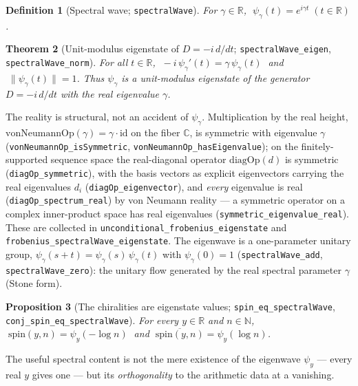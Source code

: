 \documentclass[11pt]{article}
\newtheorem{definition}{Definition}[section]
\newtheorem{theorem}[definition]{Theorem}
\newtheorem{proposition}[definition]{Proposition}
\newcommand{\C}{\mathbb{C}}
\newcommand{\R}{\mathbb{R}}
\newcommand{\N}{\mathbb{N}}
\newcommand{\conj}[1]{\overline{#1}}
\newcommand{\code}[1]{\texttt{#1}}
\begin{document}
\begin{definition}[Spectral wave; \code{spectralWave}]\label{def:wave}
For $\gamma\in\R$, $\;\psi_\gamma(t)=e^{i\gamma t}\;(t\in\R)$.
\end{definition}

\begin{theorem}[Unit-modulus eigenstate of $D=-i\,d/dt$; \code{spectralWave\_eigen}, \code{spectralWave\_norm}]\label{thm:wave}
For all $t\in\R$, $\;-i\,\psi_\gamma'(t)=\gamma\,\psi_\gamma(t)\;$ and $\;\|\psi_\gamma(t)\|=1$. Thus
$\psi_\gamma$ is a unit-modulus eigenstate of the generator $D=-i\,d/dt$ with the real eigenvalue
$\gamma$.
\end{theorem}

The reality is structural, not an accident of $\psi_\gamma$. Multiplication by the real height,
$\mathrm{vonNeumannOp}(\gamma)=\gamma\cdot\mathrm{id}$ on the fiber $\C$, is symmetric with
eigenvalue $\gamma$ (\code{vonNeumannOp\_isSymmetric}, \code{vonNeumannOp\_hasEigenvalue}); on the
finitely-supported sequence space the real-diagonal operator $\mathrm{diagOp}(d)$ is symmetric
(\code{diagOp\_symmetric}), with the basis vectors as explicit eigenvectors carrying the real
eigenvalues $d_i$ (\code{diagOp\_eigenvector}), and \emph{every} eigenvalue is real
(\code{diagOp\_spectrum\_real}) by von Neumann reality --- a symmetric operator on a complex
inner-product space has real eigenvalues (\code{symmetric\_eigenvalue\_real}). These are collected in
\code{unconditional\_frobenius\_eigenstate} and \code{frobenius\_spectralWave\_eigenstate}. The
eigenwave is a one-parameter unitary group, $\psi_\gamma(s+t)=\psi_\gamma(s)\,\psi_\gamma(t)$ with
$\psi_\gamma(0)=1$ (\code{spectralWave\_add}, \code{spectralWave\_zero}): the unitary flow generated by
the real spectral parameter $\gamma$ (Stone form).

\begin{proposition}[The chiralities are eigenstate values; \code{spin\_eq\_spectralWave}, \code{conj\_spin\_eq\_spectralWave}]\label{prop:chiral}
For every $y\in\R$ and $n\in\N$, $\;\mathrm{spin}(y,n)=\psi_y(-\log n)\;$ and
$\;\conj{\mathrm{spin}(y,n)}=\psi_y(\log n)$.
\end{proposition}

The useful spectral content is not the mere existence of the eigenwave $\psi_y$ --- every real $y$
gives one --- but its \emph{orthogonality} to the arithmetic data at a vanishing.
\end{document}
